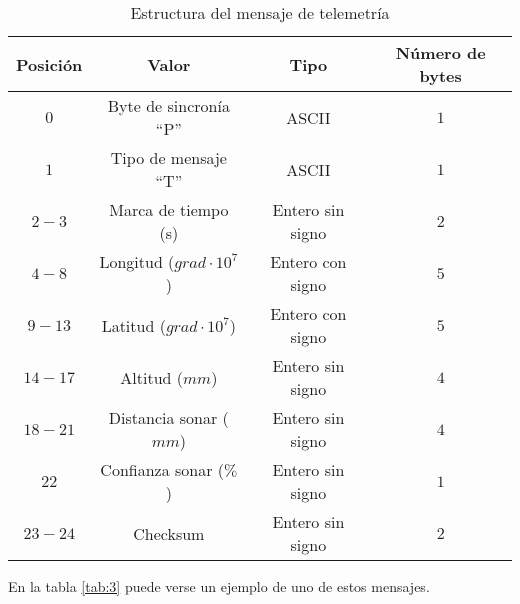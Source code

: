 \begin{table}[h]
	\centering
	\caption{Estructura del mensaje de telemetría}
	\begin{tabular}{|c|c|c|c|}\hline 
		\textbf{Posición}	& \textbf{Valor} & \textbf{Tipo} &\textbf{Número de bytes} \\ \hline \hline 
		$0$		& Byte de sincronía ``P''				& ASCII	 			&	$1$ \\  \hline
		$1$		& Tipo de mensaje ``T''				& ASCII	 			&	$1$ \\  \hline
		$2-3$	& Marca de tiempo (s)				& Entero sin signo	&   $2$ \\  \hline
		$4-8$	& Longitud ($grad \cdot 10^{7}$)	& Entero con signo	&   $5$ \\  \hline
		$9-13$	& Latitud ($grad \cdot 10^{7}$)		& Entero con signo	&  	$5$ \\  \hline
		$14-17$	& Altitud ($mm$)					& Entero sin signo	&   $4$ \\  \hline
		$18-21$	& Distancia sonar ($mm$)			& Entero sin signo	&   $4$ \\  \hline
		$22$	& Confianza sonar ($\%$)			& Entero sin signo	&   $1$ \\  \hline
		$23-24$	& Checksum 							& Entero sin signo	&   $2$ \\  \hline
	\end{tabular}
	\label{tab:2}
\end{table}

En la tabla \ref{tab:3} puede verse un ejemplo de uno de estos mensajes.

